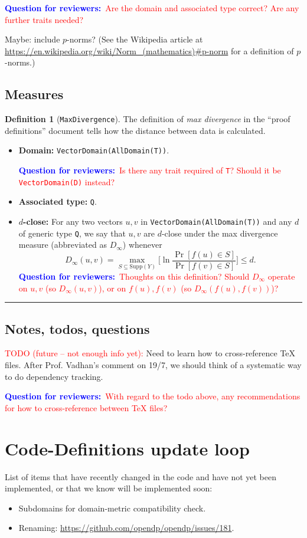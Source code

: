 \documentclass[11pt,a4paper]{article}
\theoremstyle{definition}
\newtheorem{definition}[theorem]{Definition}
\newcommand{\horizline}{\noindent\rule{\textwidth}{1pt}}
\newcommand{\metricDefn}[1]{The definition of \emph{#1} in the ``proof definitions'' document tells how the distance between data is calculated.}
\newcommand{\questionr}[1]{\textcolor{blue}{\textbf{Question for reviewers:}}\textcolor{red}{~#1}}
\newcommand{\todonei}{{\textcolor{red}{TODO (future -- not enough info yet): }}}
\begin{document}
\questionr{Are the domain and associated type correct? Are any further traits needed?}

Maybe: include $p$-norms? (See the Wikipedia article at \url{https://en.wikipedia.org/wiki/Norm_(mathematics)\#p-norm} for a definition of $p$-norms.)

\subsection{Measures}

\begin{definition}[\texttt{MaxDivergence}]
    \metricDefn{max divergence} 
    \begin{itemize}
    \item \textbf{Domain:} \texttt{VectorDomain(AllDomain(T))}.
    
    \questionr{Is there any trait required of \texttt{T}? Should it be \texttt{VectorDomain(D)} instead?}
    \item \textbf{Associated type:} \texttt{Q}.
    \item \textbf{$d$-close:} For any two vectors $u, v$ in \texttt{VectorDomain(AllDomain(T))} and any $d$ of generic type \texttt{Q}, we say that $u, v$ are $d$-close under the max divergence measure (abbreviated as $D_{\infty}$) whenever
    \[
        D_{\infty}(u, v) = \max_{S \subseteq \textrm{Supp}(Y)} \Big[\ln \dfrac{\Pr[f(u) \in S]}{\Pr[f(v) \in S]} \Big] \leq d.
    \]
    \questionr{Thoughts on this definition? Should $D_{\infty}$ operate on $u,v$ (so $D_{\infty}(u,v)$), or on $f(u),f(v)$ (so $D_{\infty}(f(u),f(v))$)?}
\end{itemize}
\end{definition}

\horizline

\subsection{Notes, todos, questions}

\todonei{Need to learn how to cross-reference TeX files. After Prof. Vadhan's comment on 19/7, we should think of a systematic way to do dependency tracking.}

\questionr{With regard to the todo above, any recommendations for how to cross-reference between TeX files?}

\section{Code-Definitions update loop}
List of items that have recently changed in the code and have not yet been implemented, or that we know will be implemented soon:
\begin{itemize}
    \item Subdomains for domain-metric compatibility check.
    \item Renaming: \url{https://github.com/opendp/opendp/issues/181}.
\end{itemize}
\end{document}
